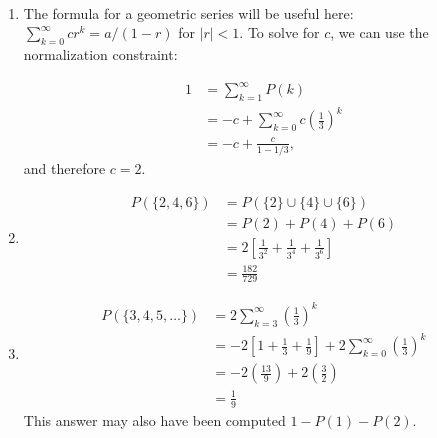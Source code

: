 \begin{problem}{16} $ $
	\begin{enumerate}
		
		\item The formula for a geometric series will be useful here: $\sum_{k=0}^{\infty} c r^k = a/(1-r)$ for $|r|<1$.  To solve for $c$, we can use the normalization constraint:
		
		\begin{align*}
			1 &= \sum_{k=1}^{\infty} P(k) \\
			& = -c+\sum_{k=0}^{\infty} c\left (\frac{1}{3} \right)^k \\
			& = -c +\frac{c}{1-1/3}, 
		\end{align*}
and therefore $c=2$.

		\item 
			\begin{align*}
			P(\{ 2, 4, 6\}) &=P(\{2 \} \cup \{ 4 \} \cup \{6\}) \\
			& = P(2)+P(4)+P(6) \\
			& =2\left[\frac{1}{3^2}+ \frac{1}{3^4}+\frac{1}{3^6}\right] \\
			& = \frac{182}{729}
			\end{align*}
			
		\item 
			\begin{align*}
			P(\{ 3, 4, 5, \ldots \}) &= 2\sum_{k=3}^{\infty} \left( \frac{1}{3}\right)^k \\
			&= -2\left[1+\frac{1}{3} +\frac{1}{9} \right]+ 2\sum_{k=0}^{\infty} \left( \frac{1}{3}\right)^k \\
			& = - 2 \left( \frac{13}{9} \right) +2\left(\frac{3}{2}\right) \\
			& =\frac{1}{9}
			\end{align*}
  This answer may also have been computed $1-P(1)-P(2)$.
 	\end{enumerate}
\end{problem} 



